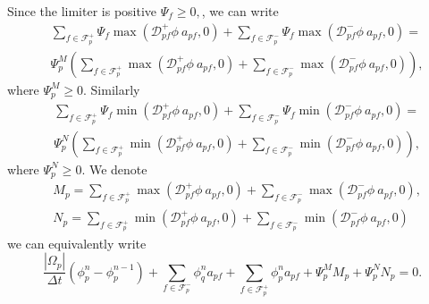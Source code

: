 \documentclass[../thesis.tex]{subfiles}
\begin{document}
Since the limiter is positive \(\Psi_f \geq 0, \), we can write
\begin{equation}
    \begin{split}
        &\sum_{f \in \mathcal{F}_p^+}
        \Psi_{f}\max\left( \mathcal{D}^+_{pf}\phi\ a_{pf}, 0 \right)
        +\sum_{f \in \mathcal{F}_p^-}
        \Psi_{f}\max\left( \mathcal{D}^-_{pf}\phi\ a_{pf}, 0 \right)
        =\\
        &\Psi_{p}^M\left(
            \sum_{f \in \mathcal{F}_p^+}
            \max\left( \mathcal{D}^+_{pf}\phi\ a_{pf}, 0 \right)
            +\sum_{f \in \mathcal{F}_p^-}
            \max\left( \mathcal{D}^-_{pf}\phi\ a_{pf}, 0 \right)
        \right),
    \end{split}
\end{equation}
where \(\Psi_{p}^M \geq 0. \)
Similarly
\begin{equation}
    \begin{split}
        &\sum_{f \in \mathcal{F}_p^+}
        \Psi_{f}\min\left( \mathcal{D}^+_{pf}\phi\ a_{pf}, 0 \right)
        +\sum_{f \in \mathcal{F}_p^-}
        \Psi_{f}\min\left( \mathcal{D}^-_{pf}\phi\ a_{pf}, 0 \right)
        =\\
        &\Psi_{p}^N\left(
            \sum_{f \in \mathcal{F}_p^+}
            \min\left( \mathcal{D}^+_{pf}\phi\ a_{pf}, 0 \right)
            +\sum_{f \in \mathcal{F}_p^-}
            \min\left( \mathcal{D}^-_{pf}\phi\ a_{pf}, 0 \right)
        \right),
    \end{split}
\end{equation}
where \(\Psi_{p}^N \geq 0. \)
We denote
\begin{equation}
    \begin{split}
        &M_p = \sum_{f \in \mathcal{F}_p^+}
        \max\left( \mathcal{D}^+_{pf}\phi\ a_{pf}, 0 \right)
        +\sum_{f \in \mathcal{F}_p^-}
        \max\left( \mathcal{D}^-_{pf}\phi\ a_{pf}, 0 \right),\\
        &N_p = \sum_{f \in \mathcal{F}_p^+}
        \min\left( \mathcal{D}^+_{pf}\phi\ a_{pf}, 0 \right)
        +\sum_{f \in \mathcal{F}_p^-}
        \min\left( \mathcal{D}^-_{pf}\phi\ a_{pf}, 0 \right)
    \end{split}
\end{equation}
we can equivalently write
\begin{equation}
        \frac{|\Omega_p|}{\Delta t}(\phi^{n}_p - \phi_p^{n-1})
        + \sum_{f \in \mathcal{F}_p^-} \phi_q^{n} a_{pf}
        + \sum_{f \in \mathcal{F}_p^+} \phi_p^{n} a_{pf}
        +\Psi_p^M M_p + \Psi_p^N N_p
        = 0.
\end{equation}
\end{document}
